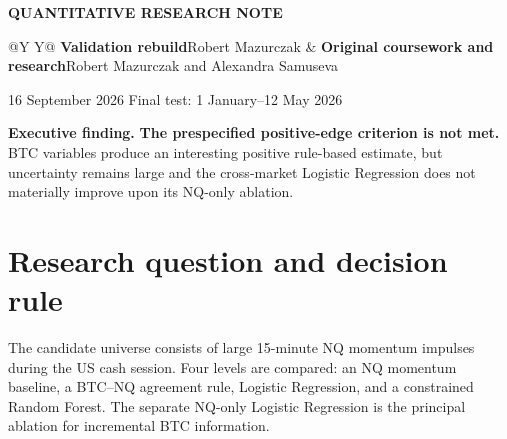 \documentclass[10pt]{article}
\newcommand{\result}[1]{\textbf{\color{navy}#1}}
\begin{document}
\begingroup\raggedright
{\small\color{teal}\textbf{QUANTITATIVE RESEARCH NOTE}\par}
\vspace{-1pt}{\color{navy}\rule{\textwidth}{1.2pt}\par}
\vspace{12pt}
\endgroup

\begin{tabularx}{\textwidth}{@{}Y Y@{}}
\textbf{Validation rebuild}\newline Robert Mazurczak &
\textbf{Original coursework and research}\newline Robert Mazurczak and Alexandra Samuseva
\end{tabularx}
\vspace{6pt}
{\small\color{slate}16 September 2026 \quad\textbar\quad Final test: 1 January--12 May 2026}

\begin{abstract}
\noindent This study asks whether BTC-derived variables improve prediction of Nasdaq futures event returns over a comparable NQ-only momentum baseline after realistic costs. The earlier notebook work is rebuilt as a causal event pipeline: features are known at minute $t$ close, execution occurs at the next open, positions do not overlap, discontinuities are rejected, and model choices are made from purged expanding walk-forward predictions. The locked final test contains 824 candidate events. The BTC--NQ rule and Random Forest have positive point estimates, but every 95\% block-bootstrap interval crosses zero. The useful result is a reproducible model-validation study, not a claim of deployable alpha.
\end{abstract}

\begin{findingbox}
\textbf{Executive finding.} \result{The prespecified positive-edge criterion is not met.} BTC variables produce an interesting positive rule-based estimate, but uncertainty remains large and the cross-market Logistic Regression does not materially improve upon its NQ-only ablation.
\end{findingbox}

\section{Research question and decision rule}
The candidate universe consists of large 15-minute NQ momentum impulses during the US cash session. Four levels are compared: an NQ momentum baseline, a BTC--NQ agreement rule, Logistic Regression, and a constrained Random Forest. The separate NQ-only Logistic Regression is the principal ablation for incremental BTC information.
\end{document}
